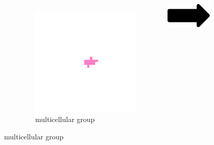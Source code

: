 \begin{figure}
\begin{columns}
\begin{column}{0.05\textwidth}
\end{column}
\begin{column}{0.25\textwidth}
  \begin{subfigure}[b]{\textwidth}
    \includegraphics[width=\textwidth,trim={300 300 250 250},clip]{img/lifecycle-2}
    \caption{multicellular group}
    \label{fig:lifecycle-2}
  \end{subfigure}%
\end{column}
\begin{column}{0.05\textwidth}
  \vspace{3ex}
  \includegraphics[width=\textwidth]{img/arrow}
\end{column}
\begin{column}{0.25\textwidth}

\end{column}
\end{columns}
\end{figure}
